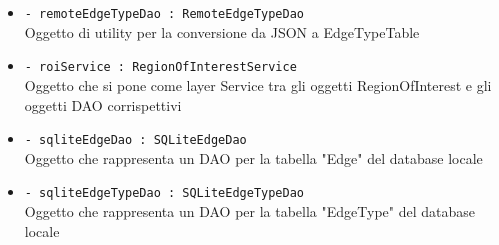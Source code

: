 \documentclass[../DefinizioneDiProdotto.tex]{subfiles}
\begin{document}
\begin{description}
\begin{itemize}
		\item \texttt{- remoteEdgeTypeDao : RemoteEdgeTypeDao}\\
		Oggetto di utility per la conversione da JSON a EdgeTypeTable
		
		\item \texttt{- roiService : RegionOfInterestService}\\
		Oggetto che si pone come layer Service tra gli oggetti RegionOfInterest e gli oggetti DAO corrispettivi
		
		\item \texttt{- sqliteEdgeDao : SQLiteEdgeDao}\\
		Oggetto che rappresenta un DAO per la tabella "Edge" del database locale
		
		\item \texttt{- sqliteEdgeTypeDao : SQLiteEdgeTypeDao}\\
		Oggetto che rappresenta un DAO per la tabella "EdgeType" del database locale
		

\end{itemize}
\end{description}
\end{document}
